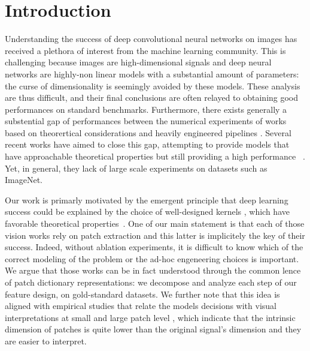 \documentclass{article}
\begin{document}
\section{Introduction}
Understanding the success of deep convolutional neural networks on images has received a plethora of interest from the machine learning community. 
This is challenging because images are high-dimensional signals and deep neural networks are highly-non linear models  with a substantial amount of parameters: the curse of dimensionality is seemingly avoided by these models. These analysis are thus difficult, and  their final conclusions are often relayed to obtaining  good  performances on standard benchmarks. Furthermore, there  exists generally a substential gap  of performances between the numerical experiments of works based on theorertical considerations and heavily engineered pipelines \citep{krizhevsky2012imagenet}. Several recent works have aimed to close this gap, attempting to provide models that have approachable theoretical properties but still providing a high performance
~\citep{li2019enhanced,shankar2020neural}. Yet, in general, they lack of large scale experiments on datasets such as ImageNet.



Our work is primarly motivated by the emergent principle that  deep learning success  could be explained by the choice of  well-designed kernels \citep{mairal2016end,li2019enhanced,shankar2020neural,lu2014scale}, which have favorable theoretical properties~\citep{jacot2018neural,rahimi2008random}. One of our main statement is that each of those vision works rely on patch extraction and this latter is implicitely the key of their success.  Indeed, without ablation experiments, it is difficult to know which of  the correct modeling of the problem or  the ad-hoc engeneering choices is important. We argue that those works can be in fact understood through the common  lence of patch dictionary representations: we decompose and analyze each step of our feature design, on gold-standard  datasets. We further note that this idea is aligned with empirical studies that relate the models decisions with visual interpretations at small and large patch level
\citep{zeiler2014visualizing,brendel2019approximating}, which indicate that the intrinsic dimension of patches is quite  lower than the original signal's dimension and they are easier to interpret.
\end{document}
